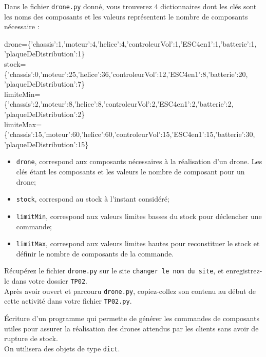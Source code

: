 \documentclass[t,10pt]{article}
\newcommand{\site}{\texttt{changer le nom du site}}
\begin{document}
Dans le fichier \texttt{drone.py} donné, vous trouverez 4 dictionnaires dont les clés sont les noms des composants et les valeurs représentent le nombre de composants nécessaire :

\begin{python}
drone=\{'chassis':1,'moteur':4,'helice':4,'controleurVol':1,'ESC4en1':1,'batterie':1,\\
'plaqueDeDistribution':1\}\\
stock=\{'chassis':0,'moteur':25,'helice':36,'controleurVol':12,'ESC4en1':8,'batterie':20,\\
'plaqueDeDistribution':7\}\\
limiteMin=\{'chassis':2,'moteur':8,'helice':8,'controleurVol':2,'ESC4en1':2,'batterie':2,\\
'plaqueDeDistribution':2\}\\
limiteMax=\{'chassis':15,'moteur':60,'helice':60,'controleurVol':15,'ESC4en1':15,'batterie':30,\\
'plaqueDeDistribution':15\}
\end{python}

\begin{itemize}
\item \texttt{drone}, correspond aux composants nécessaires à la réalisation d'un drone. Les clés étant les composants et les valeurs le nombre de composant pour un drone;
\item \texttt{stock}, correspond au stock à l'instant considéré;
\item \texttt{limitMin}, correspond aux valeurs limites basses du stock pour déclencher une commande;
\item \texttt{limitMax}, correspond aux valeurs limites hautes pour reconstituer le stock et définir le nombre de composants de la commande.
\end{itemize}


Récupérez  le fichier \texttt{drone.py} sur le site \site, et enregistrez-le dans votre dossier \texttt{TP02}.\\
Après avoir ouvert et parcouru \texttt{drone.py}, copiez-collez son contenu au début de cette activité dans votre fichier \texttt{TP02.py}.

\begin{objectif}
\'Ecriture d'un programme qui permette de générer les commandes de composants utiles pour assurer la réalisation des drones attendus par les clients sans avoir de rupture de stock.\\
On utilisera des objets de type \texttt{dict}.
\end{objectif}
\end{document}
